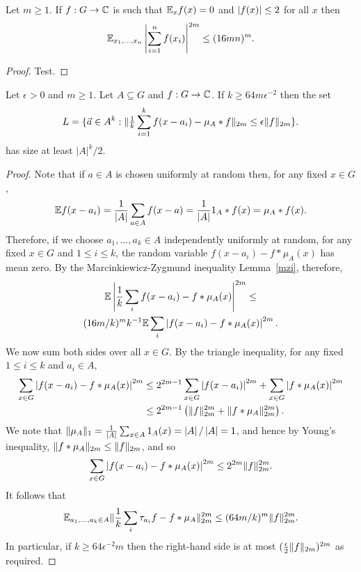 \begin{lemma}
\label{mzi_complex}
\leanok
{}
Let $m\geq 1$. If $f:G\to\mathbb{C}$ is such that $\mathbb{E}_x f(x)=0$ and $\left\lvert f(x)\right\rvert\leq 2$ for all $x$ then
\[\mathbb{E}_{x_1,\ldots,x_n} \left\lvert \sum_{i=1}^n f(x_i)\right\rvert^{2m} \leq (16mn)^{m}.\]
\end{lemma}

\begin{proof}
\leanok
Test.
\end{proof}


\begin{lemma}
\label{random_approx_expect}
\leanok
Let $\epsilon>0$ and $m\geq 1$. Let $A\subseteq G$ and $f:G\to \mathbb{C}$. If $k\geq 64m\epsilon^{-2}$ then the set
\[L=\{ {\vec{a}}\in A^k : \|\tfrac{1}{k}\sum_{i=1}^kf(x-a_i)-\mu_A\ast f\|_{2m}\leq \epsilon \| f\|_{2m}\}.\]
has size at least $\lvert A \rvert^k/2$.
\end{lemma}

\begin{proof}
\leanok
Note that if $a\in A$ is chosen uniformly at random then, for any fixed $x\in G$,
\[\mathbb{E} f(x-a_i)= \frac{1}{\left\lvert A\right\rvert}\sum_{a\in A}f(x-a)=\frac{1}{\left\lvert A\right\rvert}1_{A}\ast f(x)=\mu_A\ast f(x).\]
Therefore, if we choose $a_1,\ldots,a_k\in A$ independently uniformly at random, for any fixed $x\in G$ and $1\leq i\leq k$,  the random variable $f(x-a_i)-f\ast \mu_A(x)$ has mean zero. By the Marcinkiewicz-Zygmund inequality Lemma~\ref{mzi}, therefore,
\begin{multline*}
\mathbb{E}\left\lvert  \frac{1}{k}\sum_i f(x-a_i)-f\ast \mu_A(x)\right\rvert^{2m} \leq \\(16m/k)^mk^{-1} \mathbb{E} \sum_i \left\lvert f(x-a_i)-f\ast \mu_A(x)\right\rvert^{2m}.
\end{multline*}
We now sum both sides over all $x\in G$. By the triangle inequality, for any fixed $1\leq i\leq k$ and $a_i\in A$,
\begin{align*}
\sum_{x\in G} \left\lvert f(x-a_i)-f\ast \mu_A(x)\right\rvert^{2m}
&\leq 2^{2m-1}\sum_{x\in G}\left\lvert f(x-a_i)\right\rvert^{2m}+\sum_{x\in G}\left\lvert f\ast \mu_A(x)\right\rvert^{2m}\\
&\leq 2^{2m-1}\left( \lVert f\rVert_{2m}^{2m}+\lVert f\ast \mu_A\rVert_{2m}^{2m}\right).
\end{align*}
We note that $\lVert \mu_A\rVert_1=\frac{1}{\left\lvert A\right\rvert}\sum_{x\in A}1_{A}(x)=\left\lvert A\right\rvert/\left\lvert A\right\rvert=1$, and hence by Young's inequality, $\lVert f\ast \mu_A\rVert_{2m}\leq \lVert f\rVert_{2m}$, and so
\[\sum_{x\in G} \left\lvert f(x-a_i)-f\ast \mu_A(x)\right\rvert^{2m}\leq 2^{2m}\lVert f\rVert_{2m}^{2m}.\]
It follows that
\[\mathbb{E}_{a_1,\ldots,a_k\in A}\lVert \frac{1}{k}\sum_i\tau_{a_i}f-f\ast \mu_A\rVert_{2m}^{2m}\leq
(64m/k)^m\lVert f\rVert_{2m}^{2m}.\]
In particular, if $k\geq 64\epsilon^{-2}m$ then the right-hand side is at most $(\frac{\epsilon}{2}\lVert f\rVert_{2m})^{2m}$ as required.
\end{proof}


